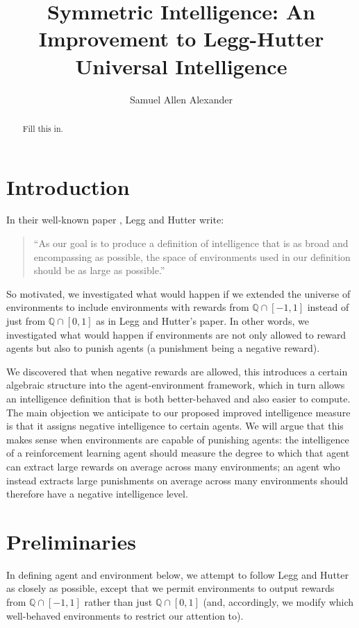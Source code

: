 \documentclass{article}
\title{Symmetric Intelligence: An Improvement to Legg-Hutter Universal Intelligence}
\author{Samuel Allen Alexander}
\begin{document}
\maketitle

\begin{abstract}
    Fill this in.
\end{abstract}

\section{Introduction}

In their well-known paper \cite{legg2007universal}, Legg and Hutter write:
\begin{quote}
    ``As our goal is to produce a definition of intelligence that is as broad and
    encompassing as possible, the space of environments used in our definition should
    be as large as possible.''
\end{quote}
So motivated, we investigated what would happen if we extended the universe
of environments to include environments with rewards from $\mathbb Q\cap [-1,1]$
instead of just from $\mathbb Q\cap [0,1]$ as in Legg and Hutter's paper.
In other words, we investigated what would happen if environments are not only
allowed to reward agents but also to punish agents (a punishment being a negative
reward).

We discovered that when negative rewards are allowed, this
introduces a certain algebraic structure into the agent-environment framework, which
in turn allows an intelligence definition that is both better-behaved and also
easier to compute. The main objection we anticipate to our proposed improved
intelligence measure is that it assigns negative intelligence to certain agents.
We will argue that this makes sense when environments are capable of punishing
agents: the intelligence of a reinforcement learning agent should measure the
degree to which that agent can extract large rewards on average across many environments;
an agent who instead extracts large punishments on average across many environments
should therefore have a negative intelligence level.

\section{Preliminaries}

In defining agent and environment below, we attempt to follow
Legg and Hutter \cite{legg2007universal} as closely as possible,
except that we permit environments to output rewards from $\mathbb Q \cap [-1,1]$
rather than just $\mathbb Q\cap [0,1]$ (and, accordingly, we modify which well-behaved
environments to restrict our attention to).
\end{document}
